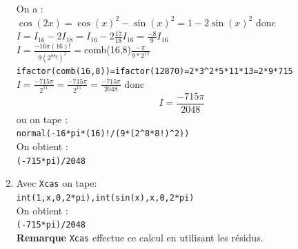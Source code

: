 \documentclass[a4paper,11pt]{book}
\begin{document}
\begin{enumerate}
On a :\\
$\cos(2x)=\cos(x)^2-\sin(x)^2=1-2\sin(x)^2$ donc\\
$I=I_{16}-2I_{18}=I_{16}-2\frac{17}{18}I_{16}=\frac{-8}{9}I_{16}$\\
$I=\frac{-16\pi(16)!}{9(2^88!)^2}=$comb(16,8)$\frac{-\pi}{9*2^{12}}$\\
{\tt ifactor(comb(16,8))=ifactor(12870)=2*3\verb|^|2*5*11*13=2*9*715}\\
$I=\frac{-715\pi}{2^{11}}=\frac{-715\pi}{2^{11}}=\frac{-715\pi}{2048}$
donc 
$$I=\frac{-715\pi}{2048}$$
ou on tape :\\
{\tt normal(-16*pi*(16)!/(9*(2\verb|^|8*8!)\verb|^|2))}\\
On obtient :\\
{\tt (-715*pi)/2048}
\item Avec {\tt Xcas} on tape:\\
{\tt int(1,x,0,2*pi),int(sin(x),x,0,2*pi)}\\
On obtient :\\
{\tt (-715*pi)/2048}\\
{\bf Remarque} {\tt Xcas} effectue ce calcul en utilisant les r\'esidus.
\end{enumerate}
\end{document}

